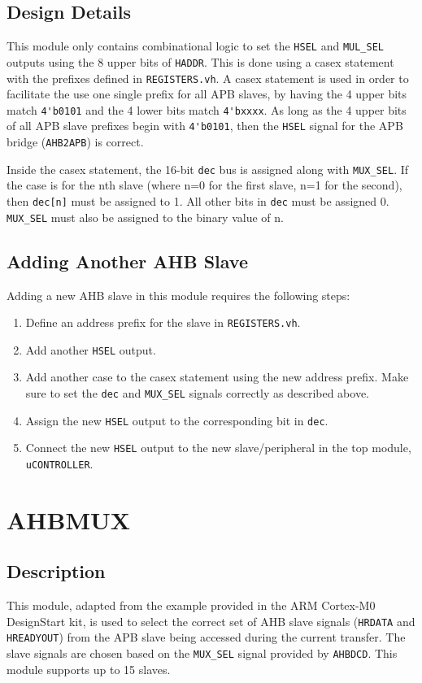 \subsection{Design Details}
This module only contains combinational logic to set the \texttt{HSEL} and \texttt{MUL\_SEL} outputs using the 8 upper bits of \texttt{HADDR}. This is done using a casex statement with the prefixes defined in \texttt{REGISTERS.vh}. A casex statement is used in order to facilitate the use one single prefix for all APB slaves, by having the 4 upper bits match \texttt{4\'{}b0101} and the 4 lower bits match \texttt{4\'{}bxxxx}. As long as the 4 upper bits of all APB slave prefixes begin with \texttt{4\'{}b0101}, then the \texttt{HSEL} signal for the APB bridge (\texttt{AHB2APB}) is correct.

Inside the casex statement, the 16-bit \texttt{dec} bus is assigned along with \texttt{MUX\_SEL}. If the case is for the nth slave (where n=0 for the first slave, n=1 for the second), then \texttt{dec[n]} must be assigned to 1. All other bits in \texttt{dec} must be assigned 0. \texttt{MUX\_SEL} must also be assigned to the binary value of n.

\subsection{Adding Another AHB Slave} \label{ahbdcd-new-slave}
Adding a new AHB slave in this module requires the following steps:

\begin{enumerate}
	\item Define an address prefix for the slave in \texttt{REGISTERS.vh}.
	\item Add another \texttt{HSEL} output.
	\item Add another case to the casex statement using the new address prefix. Make sure to set the \texttt{dec} and \texttt{MUX\_SEL} signals correctly as described above.
	\item Assign the new \texttt{HSEL} output to the corresponding bit in \texttt{dec}.
	\item Connect the new \texttt{HSEL} output to the new slave/peripheral in the top module, \texttt{uCONTROLLER}.
\end{enumerate}

\section{AHBMUX} \label{ahbmux}
\subsection{Description}
This module, adapted from the example provided in the ARM Cortex-M0 DesignStart kit, is used to select the correct set of AHB slave signals (\texttt{HRDATA} and \texttt{HREADYOUT}) from the APB slave being accessed during the current transfer. The slave signals are chosen based on the \texttt{MUX\_SEL} signal provided by \texttt{AHBDCD}. This module supports up to 15 slaves.

